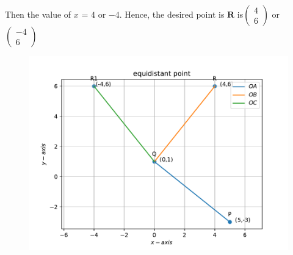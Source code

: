 \documentclass[12pt]{article}
\newcommand{\myvec}[1]{\ensuremath{\begin{pmatrix}#1\end{pmatrix}}}
\let\vec\mathbf
\begin{document}
\begin{enumerate}
Then the value of $x$ = $ 4$ or $-4$.
Hence, the desired point is $\vec{R}$ is$\myvec{ 4 \\ 6}$ or $\myvec{-4\\6}$

\begin{figure}[!h]
 \begin{center}
  \includegraphics[width=\columnwidth]{./figs/fig.pdf}
 \end{center}
\caption{}
\label{fig:Fig1}
\end{figure}



\end{enumerate}
\end{document}
